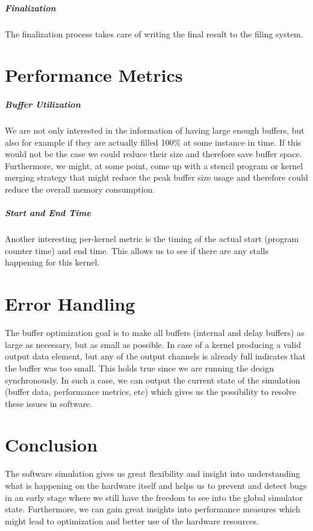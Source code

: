 \subparagraph{Finalization}
The finalization process takes care of writing the final result to the filing system.


\section{Performance Metrics}


\subparagraph{Buffer Utilization}
We are not only interested in the information of having large enough buffers, but also for example if they are actually filled 100\% at some instance in time. If this would not be the case we could reduce their size and therefore save buffer space. Furthermore, we might, at some point, come up with a stencil program or kernel merging strategy that might reduce the peak buffer size usage and therefore could reduce the overall memory consumption.


\subparagraph{Start and End Time}
Another interesting per-kernel metric is the timing of the actual start (program counter time) and end time. This allows us to see if there are any stalls happening for this kernel.



\section{Error Handling}
The buffer optimization goal is to make all buffers (internal and delay buffers) as large as necessary, but as small as possible. In case of a kernel producing a valid output data element, but any of the output channels is already full indicates that the buffer was too small. This holds true since we are running the design synchronously. In such a case, we can output the current state of the simulation (buffer data, performance metrics, etc) which gives us the possibility to resolve these issues in software.


\section{Conclusion}
The software simulation gives us great flexibility and insight into understanding what is happening on the hardware itself and helps us to prevent and detect bugs in an early stage where we still have the freedom to see into the global simulator state. Furthermore, we can gain great insights into performance measures which might lead to optimization and better use of the hardware resources.
